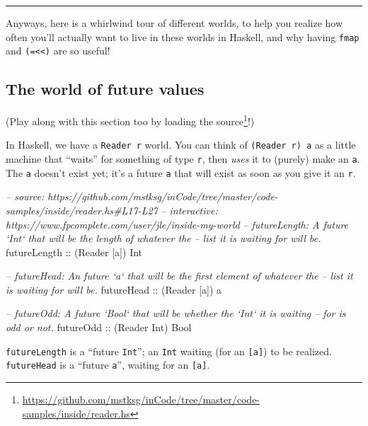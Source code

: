 \documentclass[]{article}
\newenvironment{Shaded}{}{}
\newcommand{\DataTypeTok}[1]{\textcolor[rgb]{0.56,0.13,0.00}{#1}}
\newcommand{\CommentTok}[1]{\textcolor[rgb]{0.38,0.63,0.69}{\textit{#1}}}
\newcommand{\OtherTok}[1]{\textcolor[rgb]{0.00,0.44,0.13}{#1}}
\newcommand{\NormalTok}[1]{#1}
\renewcommand{\href}[2]{#2\footnote{\url{#1}}}
\begin{document}
\begin{center}\rule{0.5\linewidth}{\linethickness}\end{center}

Anyways, here is a whirlwind tour of different worlds, to help you realize how
often you'll actually want to live in these worlds in Haskell, and why having
\texttt{fmap} and \texttt{(=\textless{}\textless{})} are so useful!

\subsection{The world of future values}\label{the-world-of-future-values}

(Play along with this section too by
\href{https://github.com/mstksg/inCode/tree/master/code-samples/inside/reader.hs}{loading
the source}!)

In Haskell, we have a \texttt{Reader\ r} world. You can think of
\texttt{(Reader\ r)\ a} as a little machine that ``waits'' for something of type
\texttt{r}, then \emph{uses} it to (purely) make an \texttt{a}. The \texttt{a}
doesn't exist yet; it's a future \texttt{a} that will exist as soon as you give
it an \texttt{r}.

\begin{Shaded}
\begin{Highlighting}[]
\CommentTok{-- source: https://github.com/mstksg/inCode/tree/master/code-samples/inside/reader.hs#L17-L27}
\CommentTok{-- interactive: https://www.fpcomplete.com/user/jle/inside-my-world}
\CommentTok{-- futureLength: A future `Int` that will be the length of whatever the}
\CommentTok{--      list it is waiting for will be.}
\OtherTok{futureLength ::}\NormalTok{ (}\DataTypeTok{Reader}\NormalTok{ [a]) }\DataTypeTok{Int}

\CommentTok{-- futureHead: An future `a` that will be the first element of whatever the}
\CommentTok{--      list it is waiting for will be.}
\OtherTok{futureHead   ::}\NormalTok{ (}\DataTypeTok{Reader}\NormalTok{ [a]) a}

\CommentTok{-- futureOdd: A future `Bool` that will be whether the `Int` it is waiting}
\CommentTok{--      for is odd or not.}
\OtherTok{futureOdd    ::}\NormalTok{ (}\DataTypeTok{Reader} \DataTypeTok{Int}\NormalTok{) }\DataTypeTok{Bool}
\end{Highlighting}
\end{Shaded}

\texttt{futureLength} is a ``future \texttt{Int}''; an \texttt{Int} waiting (for
an \texttt{{[}a{]}}) to be realized. \texttt{futureHead} is a ``future
\texttt{a}'', waiting for an \texttt{{[}a{]}}.
\end{document}
